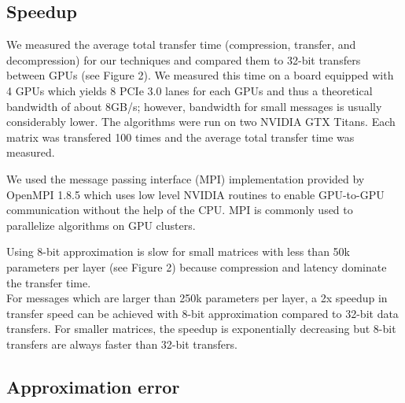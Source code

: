 \documentclass{article} %
\begin{document}
\subsection{Speedup}

We measured the average total transfer time (compression, transfer, and decompression) for our techniques and compared them to 32-bit transfers between GPUs (see Figure 2). We measured this time on a board equipped with 4 GPUs which yields 8 PCIe 3.0 lanes for each GPUs and thus a theoretical bandwidth of about 8GB/s; however, bandwidth for small messages is usually considerably lower. The algorithms were run on two NVIDIA GTX Titans. Each matrix was transfered 100 times and the average total transfer time was measured.

We used the message passing interface (MPI) implementation provided by OpenMPI 1.8.5 which uses low level NVIDIA routines to enable GPU-to-GPU communication without the help of the CPU. MPI is commonly used to parallelize algorithms on GPU clusters.

Using 8-bit approximation is slow for small matrices with less than 50k parameters per layer (see Figure 2) because compression and latency dominate the transfer time.\\
For messages which are larger than 250k parameters per layer, a 2x speedup in transfer speed can be achieved with 8-bit approximation compared to 32-bit data transfers. For smaller matrices, the speedup is exponentially decreasing but 8-bit transfers are always faster than 32-bit transfers.


\subsection{Approximation error}
\end{document}
